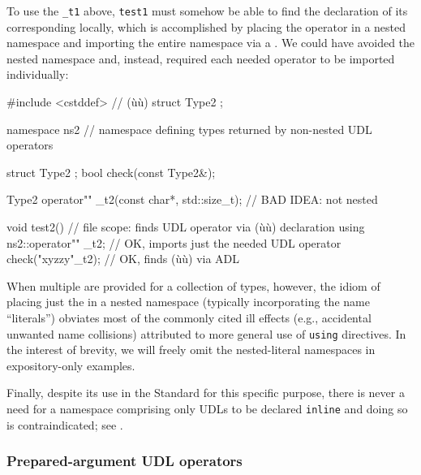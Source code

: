 \noindent To use the \lstinline!_t1!  above, \lstinline!test1! must
somehow be able to find the declaration of its corresponding  locally, which is accomplished by placing the operator in a
nested namespace and importing the entire namespace via a . We could have avoided the nested namespace and, instead, required each needed operator to be imported individually:

\begin{emcppshiddenlisting}[emcppsbatch=e9]
#include <cstddef>  // (ù{}ù)
struct Type2 {};
\end{emcppshiddenlisting}
\begin{emcppslisting}[emcppsbatch=e9]
namespace ns2  // namespace defining types returned by non-nested UDL operators
{
    struct Type2 { };
    bool check(const Type2&);

    Type2 operator"" _t2(const char*, std::size_t);  // BAD IDEA: not nested
}

void test2()  // file scope: finds UDL operator via (ù{}ù) declaration
{
    using ns2::operator"" _t2;  // OK, imports just the needed UDL operator
    check("xyzzy"_t2);          // OK, finds (ù{}ù) via ADL
}
\end{emcppslisting}

\noindent When multiple  are provided for a collection of
types, however, the idiom of placing just the  in
a nested namespace (typically incorporating the name ``literals'')
obviates most of the commonly cited ill effects (e.g., accidental
unwanted name collisions) attributed to more general use of
\lstinline!using! directives. In the interest of brevity, we will freely
omit the nested-literal namespaces in expository-only examples.

Finally, despite its use in the Standard for this specific purpose,
there is never a need for a namespace comprising only UDLs to be
declared \lstinline!inline! and doing so is contraindicated; see .

\subsubsection[Prepared-argument UDL operators]{Prepared-argument UDL operators}\label{prepared-argument-udl-operators}

